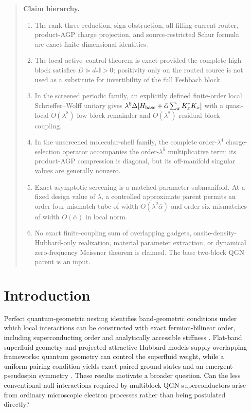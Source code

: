 \documentclass[11pt]{article}
\theoremstyle{definition}
\theoremstyle{remark}
\newcommand{\Id}{\mathbb I}
\begin{document}
\begin{quote}\small
\textbf{Claim hierarchy.}
\begin{enumerate}[leftmargin=1.6em,itemsep=0.12em,topsep=0.2em]
\item The rank-three reduction, sign obstruction, all-filling current router, product-AGP charge projection, and source-restricted Schur formula are exact finite-dimensional identities.
\item The local active--control theorem is exact provided the complete high block satisfies $D\succeq d_*\Id>0$; positivity only on the routed source is not used as a substitute for invertibility of the full Feshbach block.
\item In the screened periodic family, an explicitly defined finite-order local Schrieffer--Wolff unitary gives $\lambda^6\Delta[H_{\rm base}+\bar\alpha\sum_xK_x^\dagger K_x]$ with a quasi-local $O(\lambda^8)$ low-block remainder and $O(\lambda^8)$ residual block coupling.
\item In the unscreened molecular-shell family, the complete order-$\lambda^4$ charge-selection operator accompanies the order-$\lambda^6$ multiplicative term; its product-AGP compression is diagonal, but its off-manifold singular values are generally nonzero.
\item Exact asymptotic screening is a matched parameter submanifold.  At a fixed design value of $\lambda$, a controlled approximate parent permits an order-four mismatch tube of width $O(\lambda^2\bar\alpha)$ and order-six mismatches of width $O(\bar\alpha)$ in local norm.
\item No exact finite-coupling sum of overlapping gadgets, onsite-density-Hubbard-only realization, material parameter extraction, or dynamical zero-frequency Meissner theorem is claimed.  The base two-block QGN parent is an input.
\end{enumerate}
\end{quote}

\section{Introduction}

Perfect quantum-geometric nesting identifies band-geometric conditions under which local interactions can be constructed with exact fermion-bilinear order, including superconducting order and analytically accessible stiffness \cite{Han2024}.  Flat-band superfluid geometry and projected attractive-Hubbard models supply overlapping frameworks: quantum geometry can control the superfluid weight, while a uniform-pairing condition yields exact paired ground states and an emergent pseudospin symmetry \cite{Peotta2015,Tovmasyan2016}.  These results motivate a broader question.  Can the less conventional null interactions required by multiblock QGN superconductors arise from ordinary microscopic electron processes rather than being postulated directly?
\end{document}
